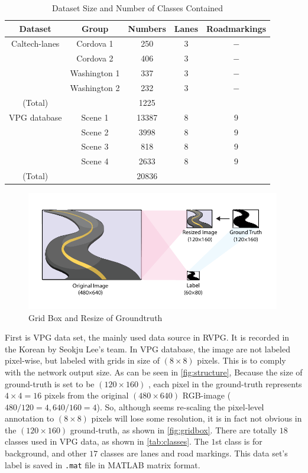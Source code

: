 \begin{spacing}{1.5}
\begin{table}[ht]
\centering
\caption{Dataset Size and Number of Classes Contained}
\label{tab:dataset}
\begin{tabular}{@{}ccccc@{}}
\toprule
Dataset & Group & Numbers & Lanes & Roadmarkings \\ \midrule
Caltech-lanes & Cordova 1 & 250 & 3 & $-$ \\
 & Cordova 2 & 406 & 3 & $-$ \\
 & Washington 1 & 337 & 3 & $-$ \\
 & Washington 2 & 232 & 3 & $-$ \\
(Total) &  & 1225 &  &  \\
VPG database & Scene 1 & 13387 & 8 & 9 \\
 & Scene 2 & 3998 & 8 & 9 \\
 & Scene 3 & 818 & 8 & 9 \\
 & Scene 4 & 2633 & 8 & 9 \\
(Total) &  & 20836 &  &  \\ \bottomrule
\end{tabular}
\end{table}

\begin{figure}[ht]
\centering
\includegraphics[width=0.99\textwidth, fbox]{Chapter3/gridbox.pdf}
\caption{Grid Box and Resize of Groundtruth}
\label{fig:gridbox} 
\end{figure}

First is VPG data set, the mainly used data source in RVPG. It is recorded in the Korean by Seokju Lee's team. In VPG database, the image are not labeled pixel-wise, but labeled with grids in size of $(8 \times 8)$ pixels. This is to comply with the network output size. As can be seen in \autoref{fig:structure}, Because the size of ground-truth is set to be $(120 \times 160)$ , each pixel in the ground-truth represents $4 \times 4 = 16$ pixels from the original $(480 \times 640)$ RGB-image ($480/120 = 4, 640/160 =  4$). So, although seems re-scaling the pixel-level annotation to $(8\times 8)$ pixels will lose some resolution, it is in fact not obvious in the $(120 \times 160)$ ground-truth, as shown in \autoref{fig:gridbox}. There are totally $18$ classes used in VPG data, as shown in \autoref{tab:classes}. The $1$st class is for background, and other $17$ classes are lanes and road markings. This data set's label is saved in \texttt{.mat} file in MATLAB matrix format.



\end{spacing}
